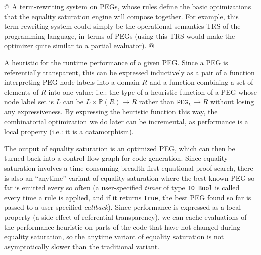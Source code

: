 \documentclass[11pt]{report}
\renewcommand{\mathtt}[1]{\ensuremath{\texttt{#1}}}
\newcommand{\mbb}[1]{\ensuremath{\mathbb{#1}}}     %
\newcommand{\mtt}[1]{\ensuremath{\mathtt{#1}}}     %
\begin{document}

\begin{easylist}[enumerate]
@ {%
  A term-rewriting system on PEGs, whose rules define the basic optimizations
  that the equality saturation engine will compose together. For example, this
  term-rewriting system could simply be the operational semantics TRS of the
  programming language, in terms of PEGs (using this TRS would make the
  optimizer quite similar to a partial evaluator).
}
@ {%
  A heuristic for the runtime performance of a given PEG. Since a PEG is
  referentially transparent, this can be expressed inductively as a pair of
  a function interpreting PEG node labels into a domain $R$\footnotemark{}
  and a function combining a set of elements of $R$ into one value; i.e.: the
  type of a heuristic function of a PEG whose node label set is $L$ can be
  $L \times \mbb{P}(R) \to R$ rather than $\mtt{PEG}_L \to R$ without
  losing any expressiveness. By expressing the heuristic function this way,
  the combinatorial optimization we do later can be incremental, as performance
  is a local property (i.e.: it is a catamorphism).

}
\end{easylist}

The output of equality saturation is an optimized PEG, which can then be turned
back into a control flow graph for code generation. Since equality saturation
involves a time-consuming breadth-first equational proof search, there is also
an ``anytime'' variant of equality saturation where the best known PEG so far
is emitted every so often (a user-specified \textit{timer} of type
\texttt{IO Bool} is called every time a rule is applied, and if it returns
\texttt{True}, the best PEG found so far is passed to a user-specified
\textit{callback}). Since performance is expressed as a local property (a side
effect of referential transparency), we can cache evaluations of the performance
heuristic on parts of the code that have not changed during equality saturation,
so the anytime variant of equality saturation is not asymptotically slower than
the traditional variant.
\end{document}
